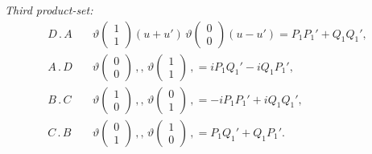 \documentclass[11pt]{article}
\begin{document}
\textit{Third product-set:}
\begin{align*}
D\mathbin{.}A\quad &\vartheta\!\begin{pmatrix} 1 \\ 1 \end{pmatrix}\!(u + u')\,\vartheta\!\begin{pmatrix} 0 \\ 0 \end{pmatrix}\!(u - u') = P_1 P_1' + Q_1 Q_1',\\
A\mathbin{.}D\quad &\vartheta\!\begin{pmatrix} 0 \\ 0 \end{pmatrix}\,,,\,\vartheta\!\begin{pmatrix} 1 \\ 1 \end{pmatrix}\,, = iP_1 Q_1' - iQ_1 P_1',\\
B\mathbin{.}C\quad &\vartheta\!\begin{pmatrix} 1 \\ 0 \end{pmatrix}\,,,\,\vartheta\!\begin{pmatrix} 0 \\ 1 \end{pmatrix}\,, = -iP_1 P_1' + iQ_1 Q_1',\\
C\mathbin{.}B\quad &\vartheta\!\begin{pmatrix} 0 \\ 1 \end{pmatrix}\,,,\,\vartheta\!\begin{pmatrix} 1 \\ 0 \end{pmatrix}\,, = P_1 Q_1' + Q_1 P_1'.
\end{align*}

\medskip
\end{document}
